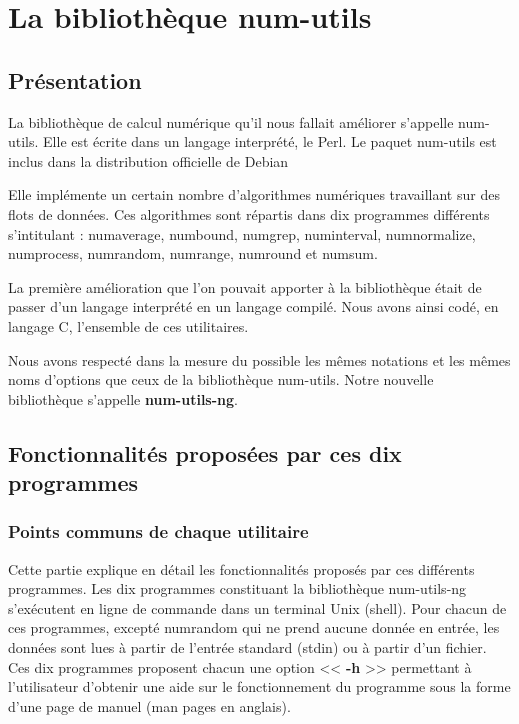 \chapter{La biblioth\`eque num-utils}
\label{chap:La bibliotheque num-utils}

\section{Pr\'esentation}

La biblioth\`eque de calcul num\'erique qu'il nous fallait am\'eliorer s'appelle num-utils. Elle est \'ecrite dans un langage
interpr\'et\'e, le Perl.
Le paquet num-utils est inclus dans la distribution officielle de Debian

Elle impl\'emente un certain nombre d'algorithmes num\'eriques travaillant sur des flots de donn\'ees.
Ces algorithmes sont r\'epartis dans dix programmes diff\'erents s'intitulant : numaverage, numbound, numgrep, numinterval, numnormalize,
numprocess, numrandom, numrange, numround et numsum.

La premi\`ere am\'elioration que l'on pouvait apporter \`a la biblioth\`eque \'etait de passer d'un langage interpr\'et\'e en un langage compil\'e.
Nous avons ainsi cod\'e, en langage C, l'ensemble de ces utilitaires.

Nous avons respect\'e dans la mesure du possible les m\^emes notations et les m\^emes noms d'options que ceux de la biblioth\`eque num-utils.
Notre nouvelle biblioth\`eque s'appelle \textbf{num-utils-ng}.

\section{Fonctionnalit\'es propos\'ees par ces dix programmes}

\subsection{Points communs de chaque utilitaire}
Cette partie explique en d\'etail les fonctionnalit\'es propos\'es par ces diff\'erents programmes.
Les dix programmes constituant la biblioth\`eque num-utils-ng s'ex\'ecutent en ligne de commande dans un terminal Unix (shell).
Pour chacun de ces programmes, except\'e numrandom qui ne prend aucune donn\'ee en entr\'ee, les donn\'ees sont lues \`a partir 
de l'entr\'ee standard (stdin) ou \`a partir d'un fichier.
Ces dix programmes proposent chacun une option << \textbf{-h} >> permettant \`a l'utilisateur d'obtenir une aide sur le fonctionnement du 
programme sous la forme d'une page de manuel (man pages en anglais).

